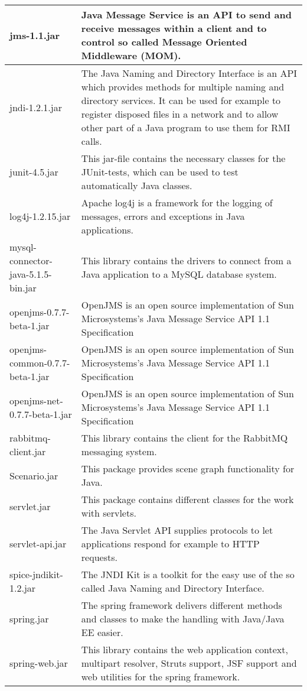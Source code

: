 \begin{center}
\begin{longtable}{|p{}|p{}|}
\hline 
jms-1.1.jar & Java Message Service is an API to send and receive messages within a client and to control so called Message Oriented Middleware (MOM).\\
\hline 
jndi-1.2.1.jar & The Java Naming and Directory Interface is an API which provides methods for multiple naming and directory services. It can be used for example to register disposed files in a network and to allow other part of a Java program to use them for RMI calls.\\
\hline 
junit-4.5.jar & This jar-file contains the necessary classes for the JUnit-tests, which can be used to test automatically Java classes.\\
\hline 
log4j-1.2.15.jar & Apache log4j is a framework for the logging of messages, errors and exceptions in Java applications.\\
\hline 
mysql-connector-java-5.1.5-bin.jar & This library contains the drivers to connect from a Java application to a MySQL database system.\\
\hline 
openjms-0.7.7-beta-1.jar & OpenJMS is an open source implementation of Sun Microsystems's Java Message Service API 1.1 Specification\\
\hline 
openjms-common-0.7.7-beta-1.jar & OpenJMS is an open source implementation of Sun Microsystems's Java Message Service API 1.1 Specification\\
\hline 
openjms-net-0.7.7-beta-1.jar & OpenJMS is an open source implementation of Sun Microsystems's Java Message Service API 1.1 Specification\\
\hline 
rabbitmq-client.jar & This library contains the client for the RabbitMQ messaging system.\\
\hline 
Scenario.jar & This package provides scene graph functionality for Java.\\
\hline 
servlet.jar & This package contains different classes for the work with servlets.\\
\hline 
servlet-api.jar & The Java Servlet API supplies protocols to let applications respond for example to HTTP requests.\\
\hline 
spice-jndikit-1.2.jar & The JNDI Kit is a toolkit for the easy use of the so called Java Naming and Directory Interface.\\
\hline 
spring.jar & The spring framework delivers different methods and classes to make the handling with Java/Java EE easier.\\
\hline 
spring-web.jar & This library contains the web application context, multipart resolver, Struts support, JSF support and web utilities for the spring framework.\\
\hline 
\end{longtable}
\label{tabular:libraries}
\end{center}
